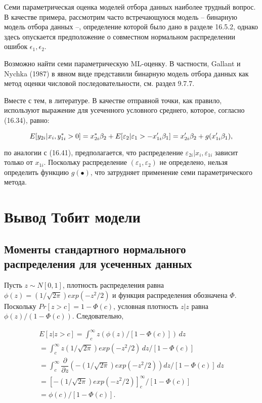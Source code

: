 Семи параметрическая оценка моделей отбора данных наиболее трудный вопрос. В качестве примера, рассмотрим часто встречающуюся модель -- бинарную модель отбора данных --, определение которой было дано в разделе 16.5.2, однако здесь опускается предположение о совместном нормальном распределении ошибок $\epsilon_1,\epsilon_2$.


Возможно найти семи параметрическую ML-оценку. В частности, Gallant и Nychka (1987) в явном виде представили бинарную модель отбора данных как метод оценки числовой последовательности, см. раздел 9.7.7.

Вместе с тем, в литературе. В качестве отправной точки, как правило, используют выражение для усеченного условного среднего, которое, согласно (16.34), равно: 

\begin{equation}
E[y_{2i}|x_i,y_{1i}^{*}>0]=x_{2i}^{*}\beta_2+E[\varepsilon_2|\varepsilon_1>-x_{1i}'\beta_1]\\
=x_{2i}'\beta_2+g(x_{1i}'\beta_1),
\end{equation}

по аналогии с (16.41), предполагается, что распределение $\varepsilon_{2i}|x_i,\varepsilon_{1i}$ зависит только от $x_{1i}$. Поскольку распределение $(\varepsilon_1,\varepsilon_2)$ не определено, нельзя определить функцию $g(\bullet)$, что затрудняет применение семи параметрического метода. 


\section{Вывод Тобит модели}

\subsection{Моменты стандартного нормального распределения для усеченных данных}

Пусть $z{\sim}N[0,1]$, плотность распределения равна $\phi(z)=(1/\sqrt{2\pi})exp(-z^2/2)$ и функция распределения обозначена $\Phi$. Поскольку $Pr[z>c]=1-\Phi(c)$, условная плотность $z|z$ равна $\phi(z)/(1-\Phi(c))$. Следовательно,


\begin{multline}
E[z|z>c]=\int_c^{\infty}z(\phi(z)/[1-\Phi(c)])\,dz\\
=\int_c^{\infty} z (1/\sqrt{2\pi})exp(-z^2/2) \,dz /[1-\Phi(c)]\\
=\int_c^{\infty}
\dfrac{\partial}{\partial{z}}
\left(-(1/\sqrt{2\pi})exp(-z^2/2)\right)
dz/
[1-\Phi(c)]\,dz\\
=\left[ -(1/\sqrt{2\pi})exp(-z^2/2) \right]_c^{\infty}/ [1-\Phi(c)]\\
=\phi(c)/[1-\Phi(c)].
\end{multline}

